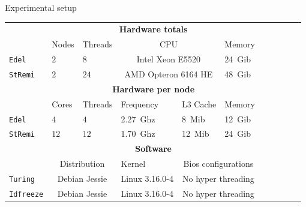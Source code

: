 \documentclass[xcolor={usenames,dvipsnames},hyperref={pdfusetitle}]{beamer}
\begin{document}
\setcounter{framenumber}{\value{finalframe}}
\begin{frame}{Experimental setup}
    \small
    \begin{tabular}{lllllllllll}
        \toprule
        & \multicolumn{5}{c}{\textbf{Hardware totals}}\\
        \cmidrule(lr){2-6}
        & Nodes & Threads & \multicolumn{2}{c}{CPU} & Memory \\
        \cmidrule(lr){2-6}
        \texttt{Edel}    & $2$ & $8$  & \multicolumn{2}{c}{Intel Xeon E5520}      & \SI{24}{Gib} \\
        \texttt{StRemi} & $2$ & $24$ & \multicolumn{2}{c}{AMD Opteron 6164 HE }& \SI{48}{Gib} \\
        \midrule
        & \multicolumn{5}{c}{\textbf{Hardware per node}}\\
        \cmidrule(lr){2-6}
        & Cores & Threads & Frequency & L3 Cache & Memory \\
        \cmidrule(lr){2-6}
        \texttt{Edel}   & $4$  & $4$   & \SI{2.27}{Ghz}& \SI{8}{Mib}  & \SI{12}{Gib} \\
        \texttt{StRemi} & $12$ & $12$  & \SI{1.70}{Ghz}& \SI{12}{Mib} & \SI{24}{Gib}\\
        \midrule
        & \multicolumn{5}{c}{\textbf{Software}}\\
        \cmidrule(lr){2-6}
        & \multicolumn{2}{c}{Distribution} & Kernel &
            \multicolumn{2}{c}{Bios configurations} \\
        \cmidrule(lr){2-6}
        \texttt{Turing}   & \multicolumn{2}{c}{Debian Jessie} & Linux 3.16.0-4 &
            \multicolumn{2}{c}{No hyper threading} \\
        \texttt{Idfreeze} & \multicolumn{2}{c}{Debian Jessie} & Linux 3.16.0-4 &
            \multicolumn{2}{c}{No hyper threading}\\
        \bottomrule
    \end{tabular}
\end{frame}
\end{document}
